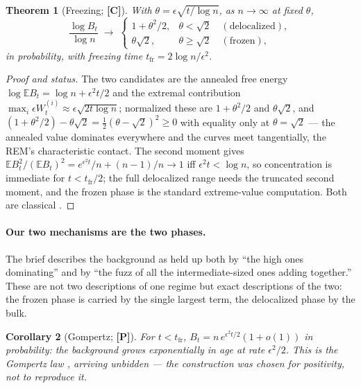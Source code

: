 \documentclass[11pt]{article}
\numberwithin{equation}{section}
\theoremstyle{plain}
\newtheorem{theorem}{Theorem}[section]
\newtheorem{corollary}[theorem]{Corollary}
\theoremstyle{definition}
\theoremstyle{remark}
\newcommand{\E}{\mathbb{E}}
\begin{document}
\begin{theorem}[Freezing; \textbf{[C]}]\label{tc:thm:freezing}
With $\theta=\epsilon\sqrt{t/\log n}$, as $n\to\infty$ at fixed
$\theta$,
\begin{equation}\label{tc:eq:freezing}
\frac{\log B_t}{\log n}\;\longrightarrow\;
\begin{cases}
1+\theta^{2}/2, & \theta<\sqrt2\quad(\text{delocalized}),\\
\theta\sqrt2, & \theta\ge\sqrt2\quad(\text{frozen}),
\end{cases}
\end{equation}
in probability, with freezing time
$t_{\mathrm{fr}}=2\log n/\epsilon^{2}$.
\end{theorem}

\begin{proof}[Proof and status]
The two candidates are the annealed free energy
$\log\E B_t=\log n+\epsilon^{2}t/2$ and the extremal contribution
$\max_i\epsilon W^{(i)}_t\approx\epsilon\sqrt{2t\log n}$; normalized
these are $1+\theta^{2}/2$ and $\theta\sqrt2$, and
$(1+\theta^{2}/2)-\theta\sqrt2=\tfrac12(\theta-\sqrt2)^{2}\ge0$ with
equality only at $\theta=\sqrt2$ --- the annealed value dominates
everywhere and the curves meet tangentially, the REM's characteristic
contact. The second moment gives
$\E B_t^{2}/(\E B_t)^{2}=e^{\epsilon^{2}t}/n+(n-1)/n\to1$ iff
$\epsilon^{2}t<\log n$, so concentration is immediate for
$t<t_{\mathrm{fr}}/2$; the full delocalized range needs the truncated
second moment, and the frozen phase is the standard extreme-value
computation. Both are classical \cite{Der81,Bov06,BBM05}.
\end{proof}

\paragraph{Our two mechanisms are the two phases.}\label{tc:rem:twophases}
The brief describes the background as held up both by ``the high ones
dominating'' and by ``the fuzz of all the intermediate-sized ones adding
together.'' These are not two descriptions of one regime but exact
descriptions of the two: the frozen phase is carried by the single
largest term, the delocalized phase by the bulk.

\begin{corollary}[Gompertz; \textbf{[P]}]\label{tc:cor:gompertz}
For $t<t_{\mathrm{fr}}$, $B_t=n\,e^{\epsilon^{2}t/2}(1+o(1))$ in
probability: the background grows exponentially in age at rate
$\epsilon^{2}/2$. This is the Gompertz law \cite{Gom25}, arriving
unbidden --- the construction was chosen for positivity, not to
reproduce it.
\end{corollary}
\end{document}
